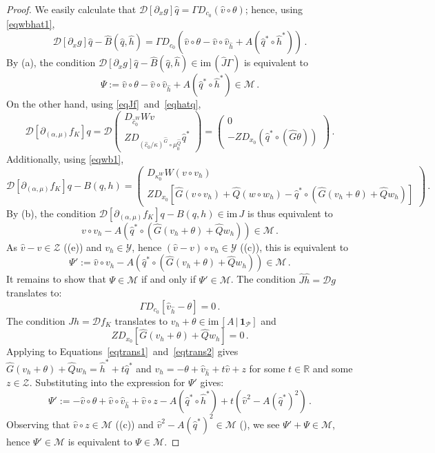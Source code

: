 \documentclass[11pt]{amsart}
\renewcommand{\k}{\kappa}
\newcommand{\R}{\mathbb{R}}
\newcommand{\wQ}{\widehat{Q}}
\newcommand{\wG}{\widehat{G}}
\newcommand{\wB}{\widehat{B}}
\newcommand{\wJ}{\hat{J}}
\newcommand{\mP}{\mathcal{P}}
\newcommand{\mM}{\mathcal{M}}
\newcommand{\mD}{\mathcal{D}}
\newcommand{\mY}{\mathcal{Y}}
\newcommand{\mZ}{\mathcal{Z}}
\theoremstyle{definition}
\begin{document}
\begin{proof}
We easily calculate that $\mD[\partial_x g]\hat{q} = \Gamma D_{c_0}(\hat{v} \circ \theta)$; hence, using \eqref{eqwbhat1}, 
\[
\mD[\partial_x g]\hat{q} - \wB(\hat{q},\hat{h}) = \Gamma D_{c_0}(\hat{v} \circ \theta - \hat{v} \circ \hat{v}_{\hat{h}} + A(\hat{q}^* \circ \hat{h}^*))\,.
\]
By (a), the condition $\mD[\partial_x g]\hat{q} - \wB(\hat{q},\hat{h}) \in \mathrm{im}\,(\wJ \Gamma)$ is equivalent to
\begin{equation}
\label{eqB5a}
\Psi:=\hat{v} \circ \theta - \hat{v} \circ \hat{v}_{\hat{h}} + A(\hat{q}^* \circ \hat{h}^*) \in \mM\,.
\end{equation}
On the other hand, using \eqref{eqJf}~and~\eqref{eqhatq},
\[
\mD[\partial_{(\alpha, \mu)}f_K]q = \mD \left(\begin{array}{c}D_{\hat{c}_0^W}Wv \\ZD_{(\hat{c}_0/\k)^{\wG}\circ \mu_0^{\wQ}}\hat{q}^*\end{array}\right) = \left(\begin{array}{c}0 \\-ZD_{x_0}(\hat{q}^* \circ (\wG \theta))\end{array}\right)\,.
\]
Additionally, using \eqref{eqwb1}, 
\[
\mD[\partial_{(\alpha, \mu)} f_K]q  - B(q,h) = \left(\begin{array}{c}D_{\k_0^W} W (v\circ v_{h})\\Z D_{x_0} [\wG (v \circ v_{h}) + \wQ (w\circ w_{h}) - \hat{q}^*\circ(\wG (v_{h}+\theta) + \wQ w_{h})]\end{array}\right)\,.
\]
By (b), the condition $\mD[\partial_{(\alpha, \mu)} f_K]q  - B(q,h) \in \mathrm{im}\,J$ is thus equivalent to 
\[
v \circ v_{h} - A(\hat{q}^* \circ (\wG (v_{h}+\theta) + \wQ w_{h}))  \in \mM\,.
\]
As $\hat{v} - v \in \mZ$ ((e)) and $v_{h} \in \mY$, hence $(\hat{v} - v) \circ v_{h} \in \mY$ ((c)), this is equivalent to
\[
\Psi':= \hat{v} \circ v_{h} - A(\hat{q}^* \circ (\wG (v_{h}+\theta) + \wQ w_{h}))  \in \mM\,.
\]
It remains to show that $\Psi \in \mM$ if and only if $\Psi' \in \mM$. The condition $\wJ\hat{h} = \mD g$ translates to:
\begin{equation}
\label{eqtrans1}
\Gamma D_{c_0}[\hat{v}_{\hat{h}}-\theta]=0\,.
\end{equation}
The condition $Jh=\mD f_K$ translates to $v_{h}+\theta \in \mathrm{im}\,[A\,|\,\bm{1}_\mP]$ and
\begin{equation}
\label{eqtrans2}
ZD_{x_0}[\wG (v_{h} + \theta) + \wQ w_{h}]=0\,.
\end{equation}
Applying  to Equations~\eqref{eqtrans1}~and~\eqref{eqtrans2} gives $\wG (v_h+\theta) + \wQ w_{h} = \hat{h}^* + t \hat{q}^*$ and $v_{h} = -\theta + \hat{v}_{\hat{h}} + t\hat{v} + z$ for some $t \in \R$ and some $z \in \mZ$. Substituting into the expression for $\Psi'$ gives:
\[
\Psi':= -\hat{v} \circ \theta + \hat{v} \circ \hat{v}_{\hat{h}} + \hat{v} \circ z - A(\hat{q}^* \circ \hat{h}^*) + t(\hat{v}^2-A(\hat{q}^*)^2)\,.
\]
Observing that $\hat{v} \circ z \in \mM$ ((c)) and $\hat{v}^2 - A(\hat{q}^*)^2 \in \mM$ (), we see $\Psi' + \Psi \in \mM$, hence $\Psi' \in \mM$ is equivalent to $\Psi \in \mM$. 
\end{proof}
\end{document}

